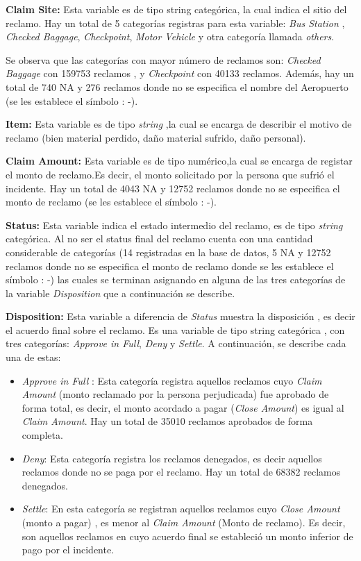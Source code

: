 \documentclass[
  letterpaper,
  onepage,
  openany]{scrreprt}
\begin{document}
\textbf{Claim Site:} Esta variable es de tipo string categórica, la cual
indica el sitio del reclamo. Hay un total de 5 categorías registras para
esta variable: \emph{Bus Station} , \emph{Checked Baggage},
\emph{Checkpoint}, \emph{Motor Vehicle} y otra categoría llamada
\emph{others}.

Se observa que las categorías con mayor número de reclamos son:
\emph{Checked Baggage} con 159753 reclamos , y \emph{Checkpoint} con
40133 reclamos. Además, hay un total de 740 NA y 276 reclamos donde no
se especifica el nombre del Aeropuerto (se les establece el símbolo :
-).

\textbf{Item:} Esta variable es de tipo \emph{string} ,la cual se
encarga de describir el motivo de reclamo (bien material perdido, daño
material sufrido, daño personal).

\textbf{Claim Amount:} Esta variable es de tipo numérico,la cual se
encarga de registar el monto de reclamo.Es decir, el monto solicitado
por la persona que sufrió el incidente. Hay un total de 4043 NA y 12752
reclamos donde no se especifica el monto de reclamo (se les establece el
símbolo : -).

\textbf{Status:} Esta variable indica el estado intermedio del reclamo,
es de tipo \emph{string} categórica. Al no ser el status final del
reclamo cuenta con una cantidad considerable de categorías (14
registradas en la base de datos, 5 NA y 12752 reclamos donde no se
especifica el monto de reclamo donde se les establece el símbolo : -)
las cuales se terminan asignando en alguna de las tres categorías de la
variable \emph{Disposition} que a continuación se describe.

\textbf{Disposition:} Esta variable a diferencia de \emph{Status}
muestra la disposición , es decir el acuerdo final sobre el reclamo. Es
una variable de tipo string categórica , con tres categorías:
\emph{Approve in Full}, \emph{Deny} y \emph{Settle}. A continuación, se
describe cada una de estas:

\begin{itemize}
\item
  \emph{Approve in Full} : Esta categoría registra aquellos reclamos
  cuyo \emph{Claim Amount} (monto reclamado por la persona perjudicada)
  fue aprobado de forma total, es decir, el monto acordado a pagar
  (\emph{Close Amount}) es igual al \emph{Claim Amount}. Hay un total de
  35010 reclamos aprobados de forma completa.
\item
  \emph{Deny}: Esta categoría registra los reclamos denegados, es decir
  aquellos reclamos donde no se paga por el reclamo. Hay un total de
  68382 reclamos denegados.
\item
  \emph{Settle}: En esta categoría se registran aquellos reclamos cuyo
  \emph{Close Amount} (monto a pagar) , es menor al \emph{Claim Amount}
  (Monto de reclamo). Es decir, son aquellos reclamos en cuyo acuerdo
  final se estableció un monto inferior de pago por el incidente.
\end{itemize}
\end{document}
